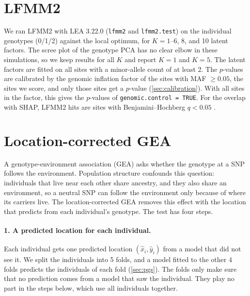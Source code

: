 \section{LFMM2}
\label{sec:lfmm}

We ran LFMM2 \citep{caye_lfmm2_2019} with LEA 3.22.0
(\texttt{lfmm2} and \texttt{lfmm2.test}) on the individual genotypes
(0/1/2) against the local optimum, for $K = 1$--6, 8, and 10 latent
factors. The scree plot of the genotype PCA has no clear elbow in these
simulations, so we keep results for all $K$ and report $K=1$ and $K=5$.
The latent factors are fitted on all sites with a minor-allele count of at
least 2. The $p$-values are calibrated by the genomic inflation factor of
the sites with MAF $\geq 0.05$, the sites we score, and only those sites
get a $p$-value (\cref{sec:calibration}). With all sites in the factor,
this gives the $p$-values of \texttt{genomic.control = TRUE}. For the
overlap with SHAP, LFMM2 hits are sites with
Benjamini--Hochberg $q < 0.05$ \citep{benjamini_hochberg_1995}.



\section{Location-corrected GEA}
\label{sec:correctedgea}

A genotype-environment association (GEA) asks whether the genotype at a
SNP follows the environment. Population structure confounds this question:
individuals that live near each other share ancestry, and they also share
an environment, so a neutral SNP can follow the environment only because
of where its carriers live. The location-corrected GEA removes this effect
with the location that \ecolocator predicts from each individual's
genotype. The test has four steps.

\paragraph{1. A predicted location for each individual.}
Each individual gets one predicted location $(\hat{x}_i, \hat{y}_i)$ from a
model that did not see it. We split the individuals into 5 folds, and a
model fitted to the other 4 folds predicts the individuals of each fold
(\cref{sec:pgs}). The folds only make sure that no prediction comes from a
model that saw the individual. They play no part in the steps below, which
use all individuals together.

